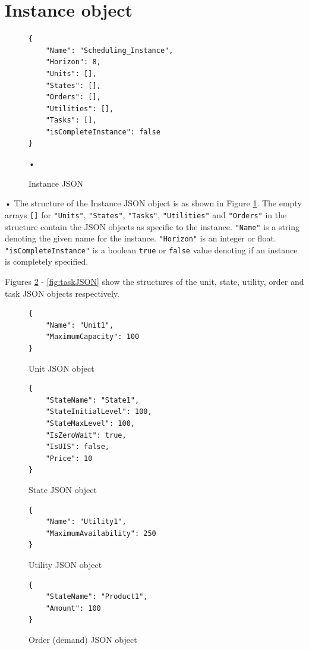 \section{Instance object}
\label{instanceCompletion}
\begin{figure}[htbp]
\begin{center}
\begin{lstlisting}[xleftmargin=.2\textwidth, xrightmargin=.2\textwidth]
{
	"Name": "Scheduling_Instance",
	"Horizon": 8,
	"Units": [],
	"States": [],
	"Orders": [],
	"Utilities": [],
	"Tasks": [],
	"isCompleteInstance": false
}
\end{lstlisting}\end{center}•
\caption{Instance JSON}
\label{code:Instance}
\end{figure}•
The structure of the Instance JSON object is as shown in Figure \ref{code:Instance}. The empty arrays \lstinline{[]} for \lstinline{"Units"}, \lstinline{"States"}, \lstinline{"Tasks"}, \lstinline{"Utilities"} and \lstinline{"Orders"} in the structure contain the JSON objects as specific to the instance. \lstinline{"Name"} is a string denoting the given name for the instance. \lstinline{"Horizon"} is an integer or float. \lstinline{"isCompleteInstance"} is a boolean \lstinline{true} or \lstinline{false} value denoting if an instance is completely specified.

Figures \ref{fig:unitJSON} - \ref{fig:taskJSON} show the structures of the unit, state, utility, order and task JSON objects respectively.
\begin{figure}[!tbp]
  \centering
  \begin{minipage}[b]{0.4\textwidth}
    \begin{lstlisting}
{
	"Name": "Unit1",
	"MaximumCapacity": 100
}
\end{lstlisting}
    \caption{Unit JSON object}
\label{fig:unitJSON}
  \end{minipage}
  \hfill
  \begin{minipage}[b]{0.4\textwidth}
    \begin{lstlisting}
{
	"StateName": "State1",
	"StateInitialLevel": 100,
	"StateMaxLevel": 100,
	"IsZeroWait": true,
	"IsUIS": false,
	"Price": 10
}
\end{lstlisting}
    \caption{State JSON object}
  \end{minipage}
\end{figure}

\begin{figure}[!tbp]
  \centering
  \begin{minipage}[b]{0.4\textwidth}
\begin{lstlisting}
{
	"Name": "Utility1",
	"MaximumAvailability": 250
}
\end{lstlisting}
    \caption{Utility JSON object}
\label{fig:utilityJSON}
  \end{minipage}
  \hfill
  \begin{minipage}[b]{0.4\textwidth}
\begin{lstlisting}
{
	"StateName": "Product1",
	"Amount": 100
}
\end{lstlisting}
    \caption{Order (demand) JSON object}
  \end{minipage}
\end{figure}

